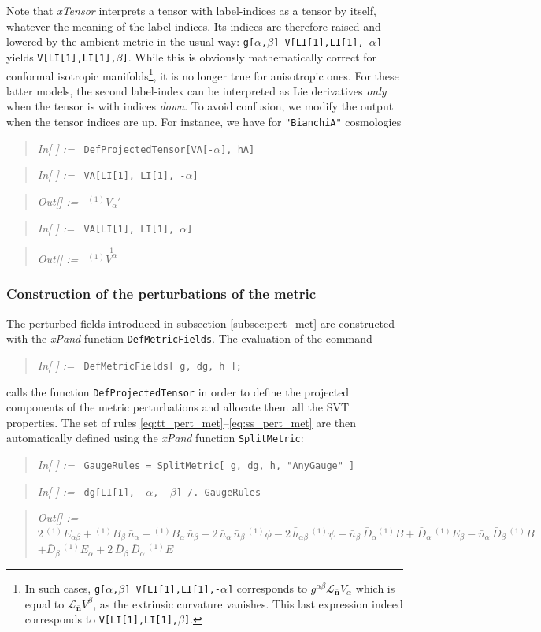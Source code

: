 \documentclass[notitlepage,onecolumn,floatfix,preprintnumbers,aps,prd,showpacs,nofootinbib,amsmath,amssymb,amsfonts]{revtex4-1}
\newcommand{\Lie}{\mathcal{L}}
\newcommand{\<}{\langle}
\renewcommand{\>}{\rangle}
\newcounter{inout}
\newcommand{\inoutput}{%
	\stepcounter{inout}%
	\theinout}
\newcommand{\mathIn}[1]{
	\begin{quotation} {\em In[\inoutput] :=\ } {\tt #1} \end{quotation}}
\newcommand{\mathOut}[1]{
	\begin{quotation} {\em Out[\theinout] :=\ } #1 \end{quotation}}
\newcommand{\mathOutTwoLines}[2]{
	\begin{quotation} {\em Out[\theinout] :=\ } {\tt #1} \\ 
	\phantom{\em Out[\theinout] := \quad \;\,}  {\tt #2}\end{quotation}}
\newcommand{\ttgr}[1]{{#1}}
\newcommand{\bb}{{\ttgr{\alpha}}}
\newcommand{\cc}{{\ttgr{\beta}}}
\begin{document}
Note that \textit{xTensor} interprets a tensor with label-indices as a tensor by itself, whatever the meaning of the label-indices. 
Its indices are therefore raised and lowered by the ambient metric in the usual way: 
{\tt g[$\alpha$,$\beta$] V[LI[1],LI[1],-$\bb$]} yields {\tt V[LI[1],LI[1],$\cc$]}. 
While this is obviously mathematically correct for conformal isotropic manifolds\footnote{%
%
In such cases, {\tt g[$\alpha$,$\beta$] \!\!\!\!\! V[LI[1],LI[1],-$\alpha$]} corresponds to $g^{\alpha \beta} \Lie_{\bm{\bar n}} V_\alpha$ 
which is equal to $\Lie_{\bm{\bar n}} V^\beta$, as the extrinsic curvature vanishes. This last expression indeed corresponds to {\tt V[LI[1],LI[1],$\beta$]}. 
%
}, it is no longer true for anisotropic ones. For these latter models, the second label-index can be interpreted 
as Lie derivatives \textit{only} when the tensor is with indices \textit{down}. To avoid confusion, 
we modify the output when the tensor indices are up. For instance, we have for {\tt "BianchiA"} cosmologies 
%
\mathIn{DefProjectedTensor[VA[-$\bb$], hA]}
\mathIn{VA[LI[1], LI[1], -$\bb$]}
\mathOut{${}^{(1)} {V_\bb}'$}
\mathIn{VA[LI[1], LI[1], $\bb$]}
\mathOut{${}^{(1)} \overset{1}{V^\bb}$}
%

\subsubsection{Construction of the perturbations of the metric}\label{secConspert}

The perturbed fields introduced in subsection \ref{subsec:pert_met} are constructed with the 
\textit{xPand} function {\tt DefMetricFields}. The evaluation of the command 
%
\mathIn{DefMetricFields[ g, dg, h ];}
%
calls the function {\tt DefProjectedTensor} in order to define the projected components of the metric perturbations 
and allocate them all the SVT properties. The set of rules \eqref{eq:tt_pert_met}--\eqref{eq:ss_pert_met} 
are then automatically defined using the \textit{xPand} function {\tt SplitMetric}: 
%
\mathIn{GaugeRules\ =\ SplitMetric[ g, dg, h, "AnyGauge" ]}
\mathIn{dg[LI[1], -$\bb$, -$\cc$]  /.\ GaugeRules }
\mathOutTwoLines{$2 \, {}^{(1)} \! E_{\bb\cc} 
	+ {}^{(1)} \! B_{\cc} \, \bar n_\bb 
	- {}^{(1)} \! B_\bb \, \bar n_\cc 
	- 2 \, \bar n_\bb \, \bar n_\cc \, {}^{(1)} \! \phi 
	- 2 \, \bar h_{\bb\cc} \, {}^{(1)} \! \psi 
	- \bar n_\cc \, \bar D_\bb {}^{(1)} \! B 
	+ \bar D_\bb \, {}^{(1)} \! E_\cc 
	- \bar n_\bb \, \bar D_\cc \, {}^{(1)} \! B $}%
	{$ + \bar D_\cc \, {}^{(1)} \! E_\bb
	+ 2 \, \bar D_\cc \, \bar D_\bb \, {}^{(1)} \! E $}
%
\end{document}
